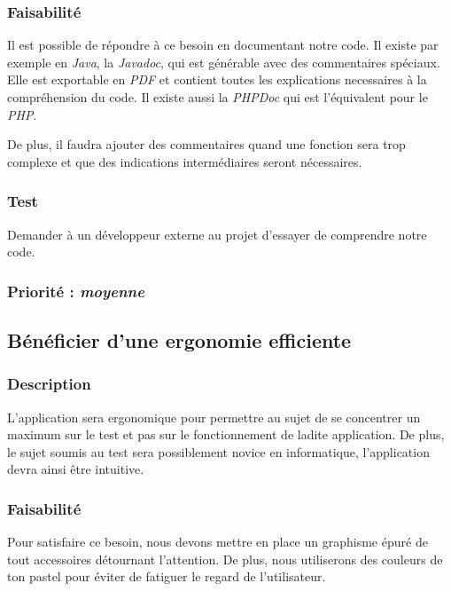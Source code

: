 \subsubsection{Faisabilité}

Il est possible de répondre à ce besoin en documentant notre code. Il existe par exemple en \textit{Java}, la \textit{Javadoc}, qui est générable avec des commentaires spéciaux. Elle est exportable en \textit{PDF} et contient toutes les explications necessaires à la compréhension du code. Il existe aussi la \textit{PHPDoc} qui est l’équivalent pour le \textit{PHP}.

De plus, il faudra ajouter des commentaires quand une fonction sera trop complexe et que des indications intermédiaires seront nécessaires.

\subsubsection{Test}

Demander à un développeur externe au projet d’essayer de comprendre notre code.

\subsubsection{Priorité : \textit{moyenne}}


\subsection{Bénéficier d’une ergonomie efficiente}

\subsubsection{Description}

L’application sera ergonomique pour permettre au sujet de se concentrer un maximum sur le test et pas sur le fonctionnement de ladite application. De plus, le sujet soumis au test sera possiblement novice en informatique, l’application devra ainsi être intuitive.

\subsubsection{Faisabilité}

Pour satisfaire ce besoin, nous devons mettre en place un graphisme épuré de tout accessoires détournant l’attention. De plus, nous utiliserons des couleurs de ton pastel pour éviter de fatiguer le regard de l’utilisateur.

